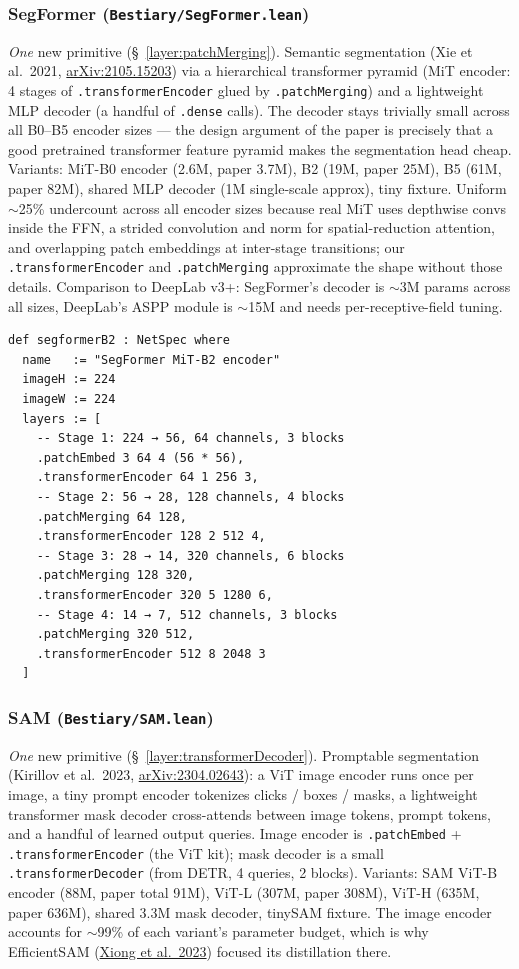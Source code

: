 \subsubsection*{SegFormer (\texttt{Bestiary/SegFormer.lean})}
\emph{One} new primitive (\S~\ref{layer:patchMerging}). Semantic segmentation (Xie et al.\ 2021,
\href{https://arxiv.org/abs/2105.15203}{arXiv:2105.15203}) via a
hierarchical transformer pyramid (MiT encoder: 4 stages of
\texttt{.transformerEncoder} glued by \texttt{.patchMerging}) and a
lightweight MLP decoder (a handful of \texttt{.dense} calls). The
decoder stays trivially small across all B0--B5 encoder sizes --- the
design argument of the paper is precisely that a good pretrained
transformer feature pyramid makes the segmentation head cheap.
Variants: MiT-B0 encoder (2.6M, paper 3.7M), B2 (19M, paper 25M),
B5 (61M, paper 82M), shared MLP decoder (1M single-scale approx),
tiny fixture. Uniform $\sim$25\% undercount across all encoder sizes
because real MiT uses depthwise convs inside the FFN, a strided
convolution and norm for spatial-reduction attention, and overlapping
patch embeddings at inter-stage transitions; our
\texttt{.transformerEncoder} and \texttt{.patchMerging} approximate
the shape without those details. Comparison to DeepLab v3+: SegFormer's
decoder is $\sim$3M params across all sizes, DeepLab's ASPP module
is $\sim$15M and needs per-receptive-field tuning.

\begin{verbatim}
def segformerB2 : NetSpec where
  name   := "SegFormer MiT-B2 encoder"
  imageH := 224
  imageW := 224
  layers := [
    -- Stage 1: 224 → 56, 64 channels, 3 blocks
    .patchEmbed 3 64 4 (56 * 56),
    .transformerEncoder 64 1 256 3,
    -- Stage 2: 56 → 28, 128 channels, 4 blocks
    .patchMerging 64 128,
    .transformerEncoder 128 2 512 4,
    -- Stage 3: 28 → 14, 320 channels, 6 blocks
    .patchMerging 128 320,
    .transformerEncoder 320 5 1280 6,
    -- Stage 4: 14 → 7, 512 channels, 3 blocks
    .patchMerging 320 512,
    .transformerEncoder 512 8 2048 3
  ]
\end{verbatim}

\subsubsection*{SAM (\texttt{Bestiary/SAM.lean})}
\emph{One} new primitive (\S~\ref{layer:transformerDecoder}). Promptable segmentation (Kirillov et
al.\ 2023, \href{https://arxiv.org/abs/2304.02643}{arXiv:2304.02643}): a ViT image encoder runs once per image, a tiny prompt
encoder tokenizes clicks / boxes / masks, a lightweight transformer
mask decoder cross-attends between image tokens, prompt tokens, and
a handful of learned output queries. Image encoder is
\texttt{.patchEmbed} + \texttt{.transformerEncoder} (the ViT kit);
mask decoder is a small \texttt{.transformerDecoder} (from DETR,
4 queries, 2 blocks). Variants: SAM ViT-B encoder (88M, paper total
91M), ViT-L (307M, paper 308M), ViT-H (635M, paper 636M), shared
3.3M mask decoder, tinySAM fixture. The image encoder accounts for
$\sim$99\% of each variant's parameter budget, which is why
EfficientSAM (\href{https://arxiv.org/abs/2312.00863}{Xiong et al.\ 2023})
focused its distillation there.


